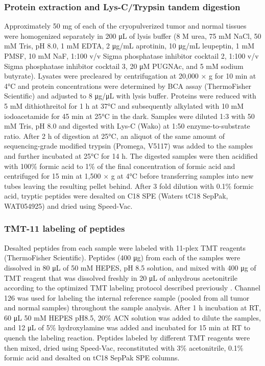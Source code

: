 \subsubsection{Protein extraction and Lys-C/Trypsin tandem digestion}
Approximately 50 mg of each of the cryopulverized tumor and normal tissues were homogenized separately in 200 μL of lysis buffer (8 M urea, 75 mM NaCl, 50 mM Tris, pH 8.0, 1 mM EDTA, 2 μg/mL aprotinin, 10 μg/mL leupeptin, 1 mM PMSF, 10 mM NaF, 1:100 v/v Sigma phosphatase inhibitor cocktail 2, 1:100 v/v Sigma phosphatase inhibitor cocktail 3, 20 μM PUGNAc, and 5 mM sodium butyrate). Lysates were precleared by centrifugation at 20,000 × g for 10 min at 4°C and protein concentrations were determined by BCA assay (ThermoFisher Scientific) and adjusted to 8 μg/μL with lysis buffer. Proteins were reduced with 5 mM dithiothreitol for 1 h at 37°C and subsequently alkylated with 10 mM iodoacetamide for 45 min at 25°C in the dark. Samples were diluted 1:3 with 50 mM Tris, pH 8.0 and digested with Lys-C (Wako) at 1:50 enzyme-to-substrate ratio. After 2 h of digestion at 25°C, an aliquot of the same amount of sequencing-grade modified trypsin (Promega, V5117) was added to the samples and further incubated at 25°C for 14 h. The digested samples were then acidified with 100\% formic acid to 1\% of the final concentration of formic acid and centrifuged for 15 min at 1,500 × g at 4°C before transferring samples into new tubes leaving the resulting pellet behind. After 3 fold dilution with 0.1\% formic acid, tryptic peptides were desalted on C18 SPE (Waters tC18 SepPak, WAT054925) and dried using Speed-Vac.

\subsubsection{TMT-11 labeling of peptides}
Desalted peptides from each sample were labeled with 11-plex TMT reagents (ThermoFisher Scientific). Peptides (400 μg) from each of the samples were dissolved in 80 μL of 50 mM HEPES, pH 8.5 solution, and mixed with 400 μg of TMT reagent that was dissolved freshly in 20 μL of anhydrous acetonitrile according to the optimized TMT labeling protocol described previously \cite{zechaj_kusterb:TMTLabeling2019}. Channel 126 was used for labeling the internal reference sample (pooled from all tumor and normal samples) throughout the sample analysis. After 1 h incubation at RT, 60 μL 50 mM HEPES pH8.5, 20\% ACN solution was added to dilute the samples, and 12 μL of 5\% hydroxylamine was added and incubated for 15 min at RT to quench the labeling reaction. Peptides labeled by different TMT reagents were then mixed, dried using Speed-Vac, reconstituted with 3\% acetonitrile, 0.1\% formic acid and desalted on tC18 SepPak SPE columns.

